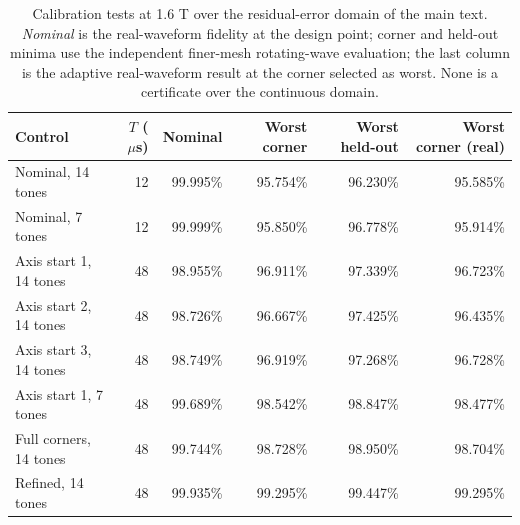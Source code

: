 \begin{table}[htbp]
\centering
\small
\setlength{\tabcolsep}{4pt}
\caption{Calibration tests at 1.6 T over the residual-error domain of the main text. \emph{Nominal} is the real-waveform fidelity at the design point; corner and held-out minima use the independent finer-mesh rotating-wave evaluation; the last column is the adaptive real-waveform result at the corner selected as worst. None is a certificate over the continuous domain.}\label{tab:robust}
\begin{tabular}{lrrrrr}
\toprule
Control & $T$ ($\mu$s) & Nominal & Worst corner & Worst held-out & Worst corner (real) \\
\midrule
Nominal, 14 tones & 12 & 99.995\% & 95.754\% & 96.230\% & 95.585\% \\
Nominal, 7 tones & 12 & 99.999\% & 95.850\% & 96.778\% & 95.914\% \\
Axis start 1, 14 tones & 48 & 98.955\% & 96.911\% & 97.339\% & 96.723\% \\
Axis start 2, 14 tones & 48 & 98.726\% & 96.667\% & 97.425\% & 96.435\% \\
Axis start 3, 14 tones & 48 & 98.749\% & 96.919\% & 97.268\% & 96.728\% \\
Axis start 1, 7 tones & 48 & 99.689\% & 98.542\% & 98.847\% & 98.477\% \\
Full corners, 14 tones & 48 & 99.744\% & 98.728\% & 98.950\% & 98.704\% \\
Refined, 14 tones & 48 & 99.935\% & 99.295\% & 99.447\% & 99.295\% \\
\bottomrule
\end{tabular}
\end{table}
